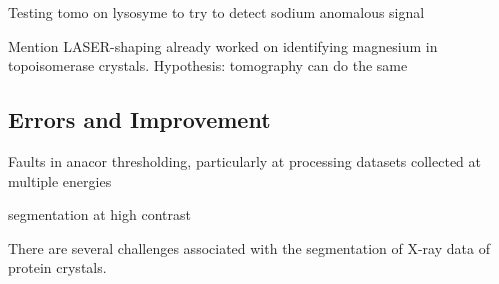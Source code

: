 Testing tomo on lysosyme to try to detect sodium anomalous signal

Mention LASER-shaping already worked on identifying magnesium in topoisomerase crystals. Hypothesis: tomography can do the same



\subsection{Errors and Improvement}

Faults in anacor thresholding, particularly at processing datasets collected at multiple energies

segmentation at high contrast

There are several challenges associated with the segmentation of X-ray data of protein crystals.